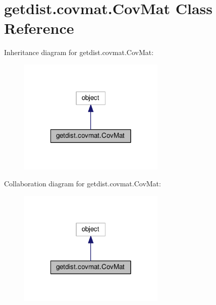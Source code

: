 \hypertarget{classgetdist_1_1covmat_1_1CovMat}{}\section{getdist.\+covmat.\+Cov\+Mat Class Reference}
\label{classgetdist_1_1covmat_1_1CovMat}


Inheritance diagram for getdist.\+covmat.\+Cov\+Mat\+:
\nopagebreak
\begin{figure}[H]
\begin{center}
\leavevmode
\includegraphics[width=198pt]{classgetdist_1_1covmat_1_1CovMat__inherit__graph}
\end{center}
\end{figure}


Collaboration diagram for getdist.\+covmat.\+Cov\+Mat\+:
\nopagebreak
\begin{figure}[H]
\begin{center}
\leavevmode
\includegraphics[width=198pt]{classgetdist_1_1covmat_1_1CovMat__coll__graph}
\end{center}
\end{figure}
